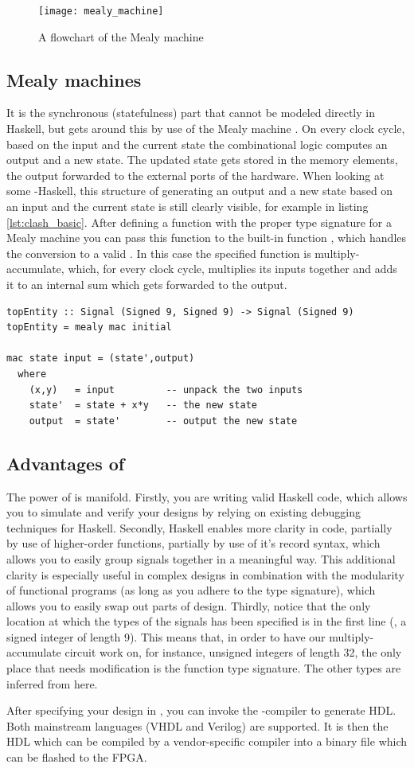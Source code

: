\begin{figure}[h]
	\centering
	\texttt{[image: mealy\_machine]}
	\caption{A flowchart of the Mealy machine}
	\label{f:mealy_machine}
\end{figure}

\subsection{Mealy machines}
It is the synchronous (statefulness) part that cannot be modeled directly in Haskell, but \clash{} gets around this by use of the Mealy machine \cite{BaaijMSc}. On every clock cycle, based on the input and the current state the combinational logic computes an output and a new state. The updated state gets stored in the memory elements, the output forwarded to the external ports of the hardware. When looking at some \clash{}-Haskell, this structure of generating an output and a new state based on an input and the current state is still clearly visible, for example in listing \ref{lst:clash_basic}. After defining a function with the proper type signature for a Mealy machine you can pass this function to the \clash{} built-in function , which handles the conversion to a valid . In this case the specified function is multiply-accumulate, which, for every clock cycle, multiplies its inputs together and adds it to an internal sum which gets forwarded to the output. \cite{CLaSHTut}


\begin{lstlisting}[caption=A basic example a multiply-accumulate specification in CλaSH, label=lst:clash_basic]
topEntity :: Signal (Signed 9, Signed 9) -> Signal (Signed 9)
topEntity = mealy mac initial

mac state input = (state',output)
  where
    (x,y)   = input         -- unpack the two inputs
    state'  = state + x*y   -- the new state
    output  = state'        -- output the new state
\end{lstlisting}

\subsection{Advantages of \clash{}}
The power of \clash{} is manifold. Firstly, you are writing valid Haskell code, which allows you to simulate and verify your designs by relying on existing debugging techniques for Haskell. Secondly, Haskell enables more clarity in code, partially by use of higher-order functions, partially by use of it's record syntax, which allows you to easily group signals together in a meaningful way. This additional clarity is especially useful in complex designs in combination with the modularity of functional programs (as long as you adhere to the type signature), which allows you to easily swap out parts of design. Thirdly, notice that the only location at which the types of the signals has been specified is in the first line (, a signed integer of length 9). This means that, in order to have our multiply-accumulate circuit work on, for instance, unsigned integers of length 32, the only place that needs modification is the  function type signature. The other types are inferred from here.


After specifying your design in \clash{}, you can invoke the \clash{}-compiler to generate HDL. Both mainstream languages (VHDL and Verilog) are supported. It is then the HDL which can be compiled by a vendor-specific compiler into a binary file which can be flashed to the FPGA. 
